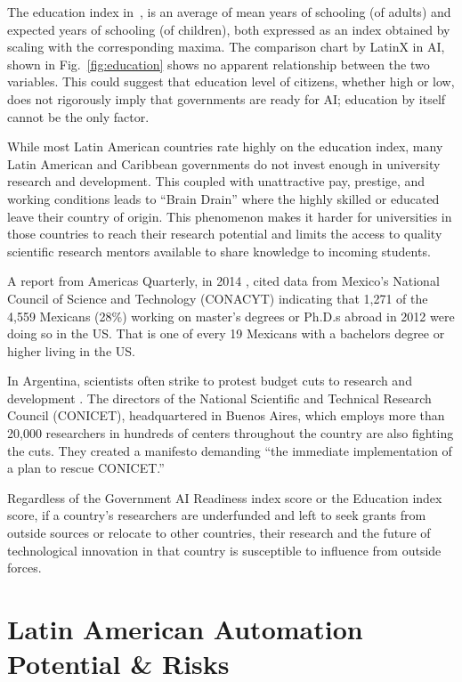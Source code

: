 \documentclass[conference]{IEEEtran}
\begin{document}
The education index in~\cite{undp2018education}, is an average of mean years of schooling (of adults) and expected years of schooling (of children), both expressed as an index obtained by scaling with the corresponding maxima. The comparison chart by LatinX in AI\texttrademark, shown in Fig.~\ref{fig:education} shows no apparent relationship between the two variables. This could suggest that education level of citizens, whether high or low, does not rigorously imply that governments are ready for AI; education by itself cannot be the only factor.

While most Latin American countries rate highly on the education index, many Latin American and Caribbean governments do not invest enough in university research and development. This coupled with unattractive pay, prestige, and working conditions leads to ``Brain Drain'' where the highly skilled or educated leave their country of origin. This phenomenon makes it harder for universities in those countries to reach their research potential and limits the access to quality scientific research mentors available to share knowledge to incoming students.

A report from Americas Quarterly, in 2014 \cite{velasco2014academic}, cited data from Mexico's National Council of Science and Technology (CONACYT) indicating that 1,271 of the 4,559 Mexicans (28\%) working on master's degrees or Ph.D.s abroad in 2012 were doing so in the US. That is one of every 19 Mexicans with a bachelors degree or higher living in the US.

In Argentina, scientists often strike to protest budget cuts to research and development \cite{debat2019plan}. The directors of the National Scientific and Technical Research Council (CONICET), headquartered in Buenos Aires, which employs more than 20,000 researchers in hundreds of centers throughout the country are also fighting the cuts. They created a manifesto demanding ``the immediate implementation of a plan to rescue CONICET.''

Regardless of the Government AI Readiness index score or the Education index score, if a country's researchers are underfunded and left to seek grants from outside sources or relocate to other countries, their research and the future of technological innovation in that country is susceptible to influence from outside forces.

\section{Latin American Automation Potential \& Risks}
\end{document}
